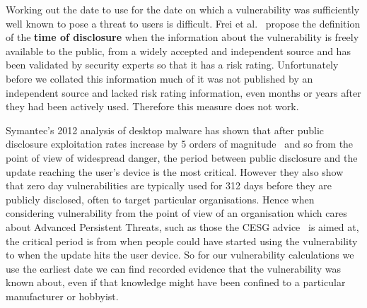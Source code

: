 \documentclass[conference,a4paper,twoside]{IEEEtran}
\begin{document}
Working out the date to use for the date on which a vulnerability was sufficiently well known to pose a threat to users is difficult.
Frei et al.~\cite{Frei2010} propose the definition of the {\bf time of disclosure} when the information about the vulnerability is freely available to the public, from a widely accepted and independent source and has been validated by security experts so that it has a risk rating.
Unfortunately before we collated this information much of it was not published by an independent source and lacked risk rating information, even months or years after they had been actively used.
Therefore this measure does not work.

Symantec's 2012 analysis of desktop malware has shown that after public disclosure exploitation rates increase by 5 orders of magnitude~\cite{Bilge2012} and so from the point of view of widespread danger, the period between public disclosure and the update reaching the user's device is the most critical.
However they also show that zero day vulnerabilities are typically used for 312 days before they are publicly disclosed, often to target particular organisations.
Hence when considering vulnerability from the point of view of an organisation which cares about Advanced Persistent Threats, such as those the CESG advice~\cite{CESG2013} is aimed at, the critical period is from when people could have started using the vulnerability to when the update hits the user device.
So for our vulnerability calculations we use the earliest date we can find recorded evidence that the vulnerability was known about, even if that knowledge might have been confined to a particular manufacturer or hobbyist.
\end{document}
